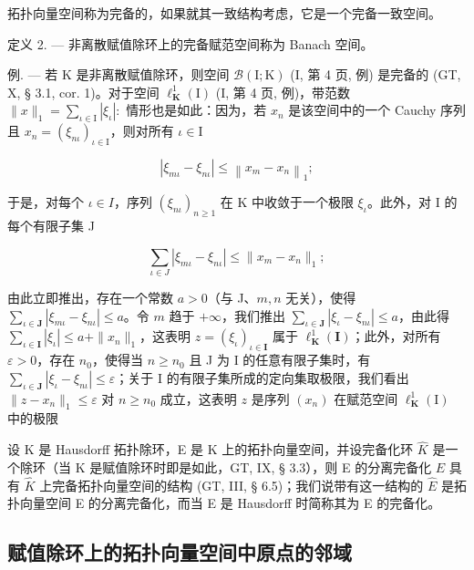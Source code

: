 拓扑向量空间称为完备的，如果就其一致结构考虑，它是一个完备一致空间。

定义 2. --- 非离散赋值除环上的完备赋范空间称为 Banach 空间。

例. --- 若 K 是非离散赋值除环，则空间 \(\mathcal{B}(\mathrm{I};\mathrm{K})\) (I, 第 4 页, 例) 是完备的 (GT, X, § 3.1, cor. 1)。对于空间 \(\ell_{\mathbf{K}}^{1}(\mathrm{I})\) (I, 第 4 页, 例)，带范数 \(\| x\| _1 = \sum_{\iota \in \mathrm{I}}|\xi_\iota |:\) 情形也是如此：因为，若 \(x_{n}\) 是该空间中的一个 Cauchy 序列且 \(x_{n} = (\xi_{n\iota})_{\iota \in \mathrm{I}}\)，则对所有 \(\iota \in \mathrm{I}\)

\[
\left| \xi_ {m\iota} - \xi_ {n\iota} \right| \leqslant \left\| x _ {m} - x _ {n} \right\| _ {1};
\]

于是，对每个 \(\iota \in I\)，序列 \((\xi_{n\iota})_{n\geqslant 1}\) 在 K 中收敛于一个极限 \(\xi_{\iota}\)。此外，对 I 的每个有限子集 J

\[
\sum_ {\iota \in J} | \xi_ {m\iota} - \xi_ {n\iota} | \leqslant \| x _ {m} - x _ {n} \| _ {1};
\]

由此立即推出，存在一个常数 \(a > 0\)（与 J、\(m, n\) 无关），使得 \(\sum_{\iota \in \mathbf{J}} |\xi_{m\iota} - \xi_{n\iota}| \leqslant a\)。令 \(m\) 趋于 \(+\infty\)，我们推出 \(\sum_{\iota \in \mathbf{J}} |\xi_{\iota} - \xi_{n\iota}| \leqslant a\)，由此得 \(\sum_{\iota \in \mathbf{I}} |\xi_{\iota}| \leqslant a + \| x_n\|_1\)，这表明 \(z = (\xi_{\iota})_{\iota \in \mathbf{I}}\) 属于 \(\ell_{\mathbf{K}}^1 (\mathbf{I})\)；此外，对所有 \(\varepsilon > 0\)，存在 \(n_0\)，使得当 \(n \geqslant n_0\) 且 J 为 I 的任意有限子集时，有 \(\sum_{\iota \in \mathbf{J}} |\xi_{\iota} - \xi_{n\iota}| \leqslant \varepsilon\)；关于 I 的有限子集所成的定向集取极限，我们看出 \(\| z - x_n\| _1\leqslant \varepsilon\) 对 \(n\geqslant n_0\) 成立，这表明 \(z\) 是序列 \((x_{n})\) 在赋范空间 \(\ell_{\mathbf{K}}^{1}(\mathrm{I})\) 中的极限

设 K 是 Hausdorff 拓扑除环，E 是 K 上的拓扑向量空间，并设完备化环 \(\hat{K}\) 是一个除环（当 K 是赋值除环时即是如此，GT, IX, § 3.3），则 E 的分离完备化 \(\hat{E}\) 具有 \(\hat{K}\) 上完备拓扑向量空间的结构 (GT, III, § 6.5)；我们说带有这一结构的 \(\hat{E}\) 是拓扑向量空间 E 的分离完备化，而当 E 是 Hausdorff 时简称其为 E 的完备化。

\subsection{赋值除环上的拓扑向量空间中原点的邻域}

